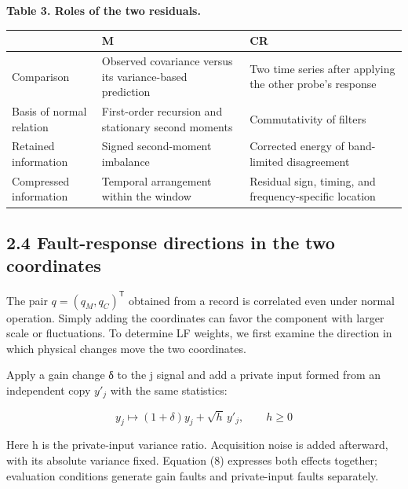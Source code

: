 \documentclass[10pt,a4paper]{article}
\newlength{\usable}
\begin{document}
\begin{table}[H]\fontsize{9.3}{12}\selectfont
\setlength{\usable}{\dimexpr\linewidth-4\tabcolsep\relax}
{\raggedright \textbf{Table 3. Roles of the two residuals.}\par}\vspace{3pt}
\noindent\begin{tabular}{@{}>{\raggedright\arraybackslash}p{0.20\usable}>{\raggedright\arraybackslash}p{0.40\usable}>{\raggedright\arraybackslash}p{0.40\usable}@{}}
\toprule
\bfseries  & \bfseries M & \bfseries CR \\
\midrule
Comparison & Observed covariance versus its variance-based prediction & Two time series after applying the other probe's response \\
Basis of normal relation & First-order recursion and stationary second moments & Commutativity of filters \\
Retained information & Signed second-moment imbalance & Corrected energy of band-limited disagreement \\
Compressed information & Temporal arrangement within the window & Residual sign, timing, and frequency-specific location \\
\bottomrule\end{tabular}\end{table}

\subsection{2.4 Fault-response directions in the two coordinates}

The pair \(q=(q_M,q_C)^{\mathsf T}\) obtained from a record is correlated even under normal operation. Simply adding the coordinates can favor the component with larger scale or fluctuations. To determine LF weights, we first examine the direction in which physical changes move the two coordinates.

Apply a gain change δ to the j signal and add a private input formed from an independent copy \(y'_j\) with the same statistics:

\begin{equation}
y_j\longmapsto(1+\delta)y_j+\sqrt h\,y'_j,\qquad h\geq0
\tag{8}
\end{equation}

Here h is the private-input variance ratio. Acquisition noise is added afterward, with its absolute variance fixed. Equation (8) expresses both effects together; evaluation conditions generate gain faults and private-input faults separately.
\end{document}
